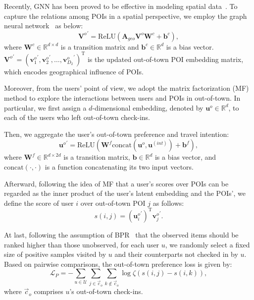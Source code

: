 \documentclass[letterpaper]{article} %
\begin{document}
Recently, GNN has been proved to be effective in modeling spatial data~\cite{zhang2020semi,li2020competitive,geng2019spatiotemporal}.
To capture the relations among POIs in a spatial perspective, we employ the graph neural network~\cite{kipf2016semi} as below:
\begin{equation}\label{e:geo_conv}
    {\mathbf{V}^o}^{\prime} =
    \mathrm{ReLU}\left(
    \mathbf{A}_{geo} \mathbf{V}^o \mathbf{W}^c + \bm{b}^c
    \right)  ,
\end{equation}
where $\mathbf{W}^c \in \mathbb{R}^{d \times d}$ is a transition matrix and $\bm{b}^c \in \mathbb{R}^d$ is a bias vector.
${\mathbf{V}^o}^{\prime} =
{\left(
{\mathbf{v}^o_1}^{\prime},{\mathbf{v}^o_2}^{\prime}, \ldots,
{\mathbf{v}^o_{D_2}}^{\prime}
\right)}^\mathrm{T}$
is the updated out-of-town POI embedding matrix,
which encodes geographical influence of POIs.

Moreover, from the users' point of view,
we adopt the matrix factorization (MF) method to explore the interactions between users and POIs in out-of-town.
In particular, we first assign a $d$-dimensional embedding, denoted by $\mathbf{u}^o \in \mathbb{R}^d$, to each of the users who left out-of-town check-ins.

Then, we aggregate the user's out-of-town preference and travel intention:
\begin{equation}\label{e:fuse}
    {\mathbf{u}^o}^{\prime} =
    \mathrm{ReLU}\left(
    \mathbf{W}^f \mathrm{concat} \left(
        \mathbf{u}^o, \mathbf{u}^{(int)}
    \right)
    + \bm{b}^f
    \right) ,
\end{equation}
where $\mathbf{W}^f \in \mathbb{R}^{d \times 2d}$ is a transition matrix, $\bm{b} \in \mathbb{R} ^ d$ is a bias vector, and
$\mathrm{concat}(\cdot, \cdot)$ is a function concatenating its two input vectors.

Afterward, following the idea of MF that a user's scores over POIs can be regarded as the inner product of the user's latent embedding and the POIs', we define the score of user $i$ over out-of-town POI $j$ as follows:
\begin{equation}\label{e:score}
    s(i,j) =
    \left({\mathbf{u}^o_i}^{\prime}\right)^\mathrm{T}
    {\mathbf{v}^o_j}^{\prime} .
\end{equation}

At last, following the assumption of BPR~\cite{rendle2012bpr} that the observed items should be ranked higher than those unobserved, for each user $u$, we randomly select a fixed size of positive samples visited by $u$ and their counterparts not checked in by $u$.
Based on pairwise comparisons, the out-of-town preference loss is given by:
\begin{equation}\label{e:bpr_loss}
    \mathcal{L}_P = -
    \sum_{u \in \mathcal{U}}
    \sum_{j \in \vec{c}_o}
    \sum_{k \notin \vec{c}_o}
    \log\zeta\left( s(i,j) - s(i,k) \right) ,
\end{equation}
where $\vec{c}_o$ comprises $u$'s out-of-town check-ins.
\end{document}
